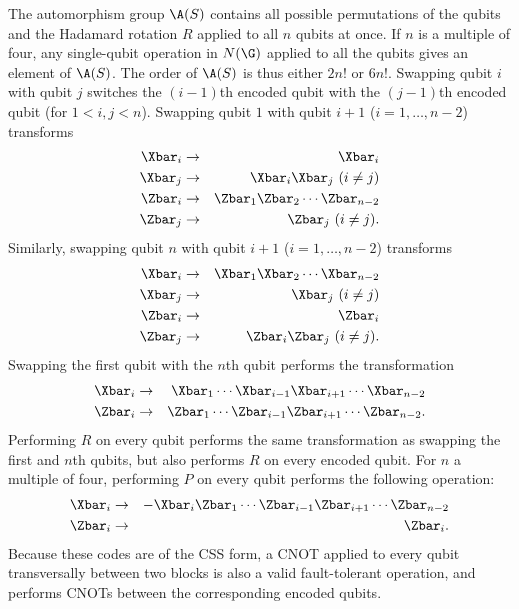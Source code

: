 The automorphism group $\A(S)$ contains all possible
permutations of the qubits and the Hadamard rotation $R$ applied to all
$n$ qubits at once.  If $n$ is a multiple of four, any single-qubit operation
in $N(\G)$ applied to all the qubits gives an element of $\A(S)$.  The order of
$\A(S)$ is thus either $2 n!$ or $6 n!$.  Swapping qubit $i$ with qubit $j$
switches the $(i-1)$th encoded qubit with the $(j-1)$th encoded qubit (for
$1 < i, j < n$).  Swapping qubit $1$ with qubit $i+1$ ($i =1, \ldots, n-2$)
transforms
\begin{eqnarray}
	\Xbar_i & \rightarrow & \Xbar_i \nonumber \\
	\Xbar_j & \rightarrow & \Xbar_i \Xbar_j\ (i \neq j) \nonumber \\
	\Zbar_i & \rightarrow & \Zbar_1 \Zbar_2 \cdots \Zbar_{n-2} \\
	\Zbar_j & \rightarrow & \Zbar_j\ (i \neq j). \nonumber
\end{eqnarray}
Similarly, swapping qubit $n$ with qubit $i+1$ ($i = 1, \ldots, n-2$)
transforms
\begin{eqnarray}
	\Xbar_i & \rightarrow & \Xbar_1 \Xbar_2 \cdots \Xbar_{n-2} \nonumber \\
	\Xbar_j & \rightarrow & \Xbar_j\ (i \neq j) \nonumber \\
	\Zbar_i & \rightarrow & \Zbar_i \\
	\Zbar_j & \rightarrow & \Zbar_i \Zbar_j\ (i \neq j). \nonumber
\end{eqnarray}
Swapping the first qubit with the $n$th qubit performs the transformation
\begin{eqnarray}
	\Xbar_i & \rightarrow & \Xbar_1 \cdots \Xbar_{i-1} \Xbar_{i+1} \cdots
	\Xbar_{n-2} \nonumber \\
	\Zbar_i & \rightarrow & \Zbar_1 \cdots \Zbar_{i-1} \Zbar_{i+1} \cdots
	\Zbar_{n-2}.
\end{eqnarray}
Performing $R$ on every qubit performs the same transformation as
swapping the first and $n$th qubits, but also performs $R$ on every
encoded qubit.  For $n$ a multiple of four, performing $P$ on every qubit
performs the following operation:
\begin{eqnarray}
	\Xbar_i & \rightarrow & - \Xbar_i \Zbar_1 \cdots \Zbar_{i-1} \Zbar_{i+1}
	\cdots \Zbar_{n-2} \nonumber \\
	\Zbar_i & \rightarrow & \Zbar_i.
\end{eqnarray}
Because these codes are of the CSS form, a CNOT applied to every qubit
transversally between two blocks is also a valid fault-tolerant operation,
and performs CNOTs between the corresponding encoded qubits.

